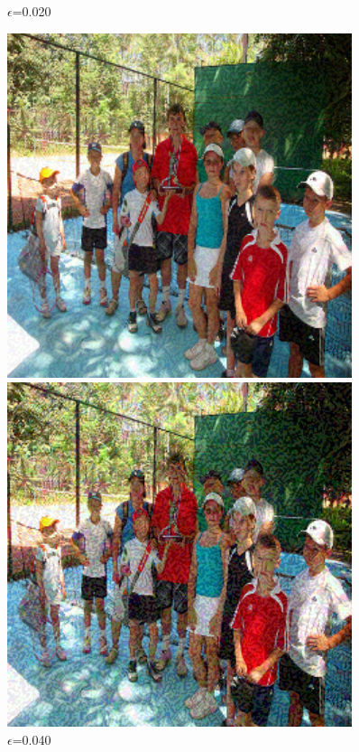 \begin{figure}[h]
\begin{minipage}{0.12\textwidth}
        \caption*{$\epsilon$=0.020}
    \end{minipage}\hfill
    \begin{minipage}{0.12\textwidth}
        \centering
        \includegraphics[width=0.9\textwidth]{figures/group_of_people/group_of_people_0.040.png}
        \caption*{$\epsilon$=0.040}
    \end{minipage}\hfill
    \begin{minipage}{0.12\textwidth}
        \centering
        \includegraphics[width=0.9\textwidth]{figures/group_of_people/group_of_people_0.080.png}

\end{minipage}
\end{figure}

